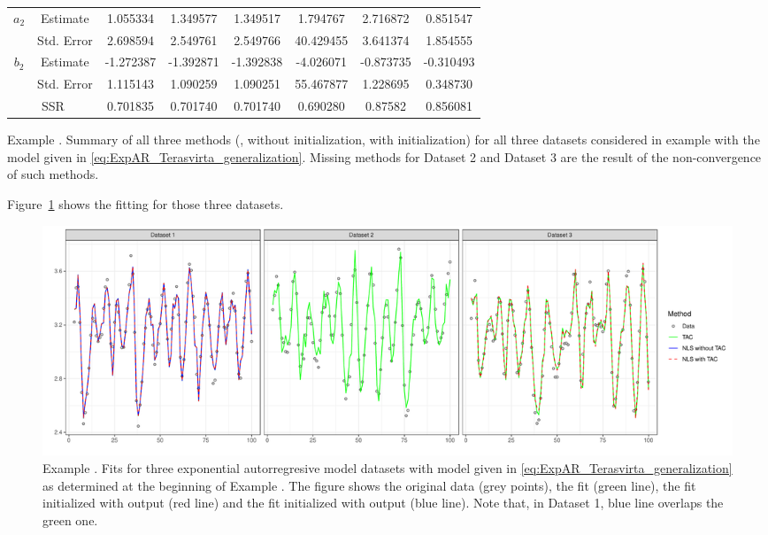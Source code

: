 \begin{widetable}[htb]
\begin{tabular}{*{8}{c}}
\midrule 
\multirow{2}{*}{$a_2$} & Estimate & 1.055334  &  1.349577  &    1.349517  &  1.794767  &  2.716872  & 0.851547      \\
  & Std. Error & 2.698594  &   2.549761 &    2.549766  &   40.429455  &  3.641374   &  1.854555 \\
\midrule 
\multirow{2}{*}{$b_2$} & Estimate & -1.272387  &  -1.392871 &  -1.392838  &  -4.026071  &  -0.873735  &  -0.310493 \\
  & Std. Error & 1.115143  &  1.090259  &   1.090251  &  55.467877   &  1.228695  &  0.348730 \\
\midrule 
\multicolumn{2}{c}{SSR} & 0.701835 & 0.701740 & 0.701740 & 0.690280 & 0.87582 & 0.856081 \\
\bottomrule
\end{tabular} 
\caption{Example . Summary of all three methods (,  without  initialization,  with  initialization) for all three datasets considered in example  with the model given in \eqref{eq:ExpAR_Terasvirta_generalization}. Missing methods for Dataset 2 and Dataset 3 are the result of the non-convergence of such methods.}
\label{t:expAR_several_seeds}
\end{widetable}



Figure~\ref{fig:expAR} shows the fitting for those three datasets. 

\begin{figure}
\centering
\includegraphics[width=\linewidth]{example5.pdf}
\caption{Example . Fits for three exponential autorregresive model datasets with model given in \eqref{eq:ExpAR_Terasvirta_generalization} as determined at the beginning of Example . The figure shows the original data (grey points), the  fit (green line), the  fit initialized with  output (red line) and the  fit initialized with  output (blue line). Note that, in Dataset 1, blue line overlaps the green one.}
\label{fig:expAR}
\end{figure}






